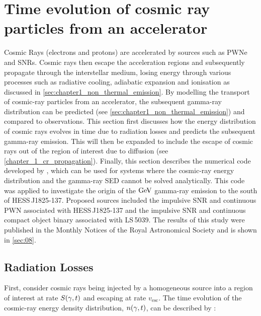 \chapter[Time evolution of CR particles]{Time evolution of cosmic ray particles from an accelerator} \label{sec:07_particle_ev}

Cosmic Rays (electrons and protons) are accelerated by sources such as PWNe and SNRs. Cosmic rays then escape the acceleration regions and subsequently propagate through the interstellar medium, losing energy through various processes such as radiative cooling, adiabatic expansion and ionisation as discussed in \autoref{sec:chapter1_non_thermal_emission}. By modelling the transport of cosmic-ray particles from an accelerator, the subsequent gamma-ray distribution can be predicted (see \autoref{sec:chapter1_non_thermal_emission}) and compared to observations.
\newpar
This section first discusses how the energy distribution of cosmic rays evolves in time due to radiation losses and predicts the subsequent gamma-ray emission. This will then be expanded to include the escape of cosmic rays out of the region of interest due to diffusion (see \autoref{chapter_1_cr_propagation}). Finally, this section describes the numerical code developed by \cite{fabien}, which can be used for systems where the cosmic-ray energy distribution and the gamma-ray SED cannot be solved analytically.
\newpar
This code was applied to investigate the origin of the $\si{\giga\electronvolt}$ gamma-ray emission to the south of \mbox{HESS\,J1825-137}. Proposed sources included the impulsive SNR and continuous PWN associated with \mbox{HESS\,J1825-137} and the impulsive SNR and continuous compact object binary associated with \mbox{LS\,5039}. The results of this study were published in the Monthly Notices of the Royal Astronomical Society and is shown in \autoref{sec:08}.

\section{Radiation Losses} \label{sec:chapter_7_cr_SED_evol} 

First, consider cosmic rays being injected by a homogeneous source into a region of interest at rate $S\qty(\gamma,t)$ and escaping at rate $v_\text{esc}$. The time evolution of the cosmic-ray energy density distribution, $n\qty(\gamma,t)$, can be described by \citep{1980gbs..bookR....M}:

